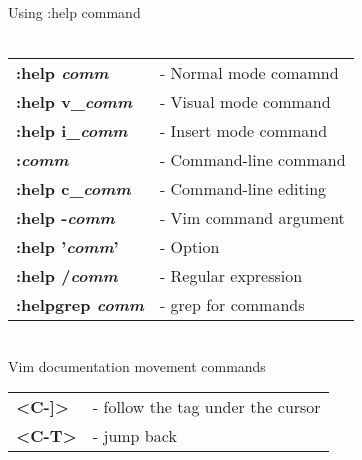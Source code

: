 \documentclass[a4paper,8pt]{extarticle}
\begin{document}
    \newcommand{\ts}[1]{\textsl{#1}}
    \newcommand{\tb}[1]{\textbf{#1}}
    \begin{multicols*}{3}

        \noindent
        {\LARGE Using :help command}\\\\
        \begin{tabular}{ l l }
            \tb{:help \ts{comm}}                        &   - Normal mode comamnd                                   \\
            \tb{:help v\_\ts{comm}}                     &   - Visual mode command                                   \\
            \tb{:help i\_\ts{comm}}                     &   - Insert mode command                                   \\
            \tb{:\ts{comm}}                             &   - Command-line command                                  \\
            \tb{:help c\_\ts{comm}}                     &   - Command-line editing                                  \\
            \tb{:help -\ts{comm}}                       &   - Vim command argument                                  \\
            \tb{:help '\ts{comm}'}                      &   - Option                                                \\
            \tb{:help /\ts{comm}}                       &   - Regular expression                                    \\
            \tb{:helpgrep \ts{comm}}                    &   - grep for commands                                     \\
        \end{tabular}\\

        \noindent
        Vim documentation movement commands\\
        \begin{tabular}{ l l }
            \tb{<C-]>}                                  &   - follow the tag under the cursor                       \\
            \tb{<C-T>}                                  &   - jump back                                             \\
        \end{tabular}\\\\


\end{multicols*}
\end{document}
